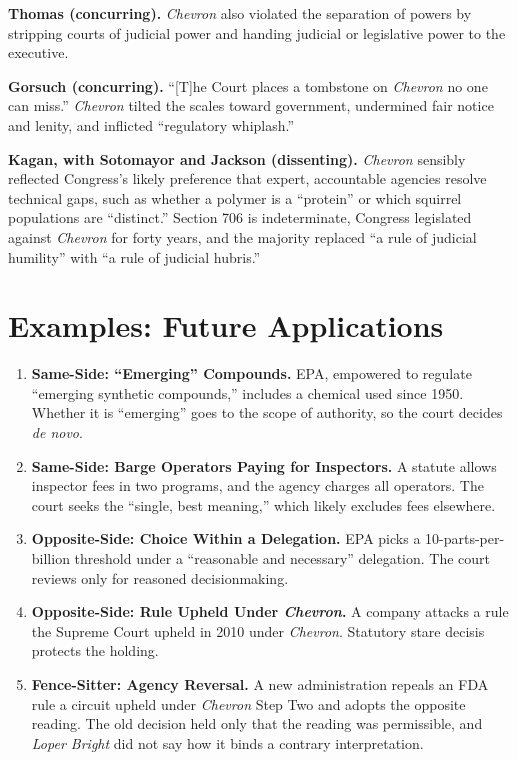 \documentclass[12pt]{article}
\begin{document}
\textbf{Thomas (concurring).} \textit{Chevron} also violated the separation of powers by stripping courts of judicial power and handing judicial or legislative power to the executive.

\textbf{Gorsuch (concurring).} ``[T]he Court places a tombstone on \textit{Chevron} no one can miss.'' \textit{Chevron} tilted the scales toward government, undermined fair notice and lenity, and inflicted ``regulatory whiplash.''

\textbf{Kagan, with Sotomayor and Jackson (dissenting).} \textit{Chevron} sensibly reflected Congress's likely preference that expert, accountable agencies resolve technical gaps, such as whether a polymer is a ``protein'' or which squirrel populations are ``distinct.'' Section 706 is indeterminate, Congress legislated against \textit{Chevron} for forty years, and the majority replaced ``a rule of judicial humility'' with ``a rule of judicial hubris.''

\section{Examples: Future Applications}

\begin{enumerate}
\item \textbf{Same-Side: ``Emerging'' Compounds.} EPA, empowered to regulate ``emerging synthetic compounds,'' includes a chemical used since 1950. Whether it is ``emerging'' goes to the scope of authority, so the court decides \textit{de novo}.
\item \textbf{Same-Side: Barge Operators Paying for Inspectors.} A statute allows inspector fees in two programs, and the agency charges all operators. The court seeks the ``single, best meaning,'' which likely excludes fees elsewhere.
\item \textbf{Opposite-Side: Choice Within a Delegation.} EPA picks a 10-parts-per-billion threshold under a ``reasonable and necessary'' delegation. The court reviews only for reasoned decisionmaking.
\item \textbf{Opposite-Side: Rule Upheld Under \textit{Chevron}.} A company attacks a rule the Supreme Court upheld in 2010 under \textit{Chevron}. Statutory stare decisis protects the holding.
\item \textbf{Fence-Sitter: Agency Reversal.} A new administration repeals an FDA rule a circuit upheld under \textit{Chevron} Step Two and adopts the opposite reading. The old decision held only that the reading was permissible, and \textit{Loper Bright} did not say how it binds a contrary interpretation.
\end{enumerate}
\end{document}
